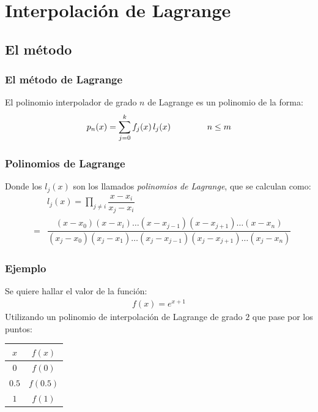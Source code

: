 \section{Interpolación de Lagrange}
\subsection{El método}
\begin{frame}
\frametitle{El método de Lagrange}
El polinomio interpolador de grado $n$ de Lagrange es un polinomio de la forma:
\begin{align*}
p_{n}(x) = \sum_{j=0}^{k} f_{j}(x) \, l_{j}(x) \hspace{1.5cm} n \leq m
\end{align*}
\end{frame}
\begin{frame}
\frametitle{Polinomios de Lagrange}
Donde los $l_{j}(x)$ son los llamados \emph{polinomios de Lagrange}, que se calculan como:
\fontsize{12}{12}\selectfont
\begin{eqnarray*}
&{}&l_{j}(x) = \prod_{j \neq i} \dfrac{x - x_{i}}{x_{j} - x_{i}} \\[0.5em]
&=& \dfrac{(x - x_{0})(x - x_{i}) \ldots(x - x_{j-1})(x - x_{j+1}) \ldots (x - x_{n})}{(x_{j} - x_{0})(x_{j} - x_{1}) \ldots(x_{j} - x_{j-1})(x_{j} - x_{j+1}) \ldots (x_{j} - x_{n})}
\end{eqnarray*}
\end{frame}
\begin{frame}
\frametitle{Ejemplo}
Se quiere hallar el valor de la función:
\begin{align*}
f(x) = e^{x+1}
\end{align*}
Utilizando un polinomio de interpolación de Lagrange de grado $2$ que pase por los puntos:
\pause
\fontsize{12}{12}\selectfont
\begin{table}
\centering
\begin{tabular}{c | c}
$x$ & $f(x)$ \\ \hline
$0$ & $f(0)$ \\
$0.5$ & $f(0.5)$ \\
$1$ & $f(1)$ \\
\end{tabular}
\end{table}
\end{frame}
